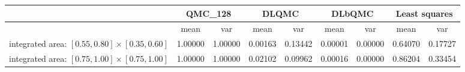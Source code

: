 \begin{tabular}{|l|c|c|c|c|c|c|c|c|}
\hline
 &\multicolumn{2}{c|}{\textbf{QMC\_128}}&\multicolumn{2}{c|}{\textbf{DLQMC}}&\multicolumn{2}{c|}{\textbf{DLbQMC}}&\multicolumn{2}{c|}{\textbf{Least squares}}\\ 
\hline

 &mean&var&mean&var&mean&var&mean&var\\ 
\hline
integrated area: $[0.55,0.80]\times [0.35,0.60]$ &1.00000&1.00000&0.00163&0.13442&0.00001&0.00000&0.64070&0.17727\\ 
\hline
integrated area: $[0.75,1.00]\times [0.75,1.00]$ &1.00000&1.00000&0.02102&0.09962&0.00016&0.00000&0.86204&0.33454\\ 
\hline
\end{tabular}

